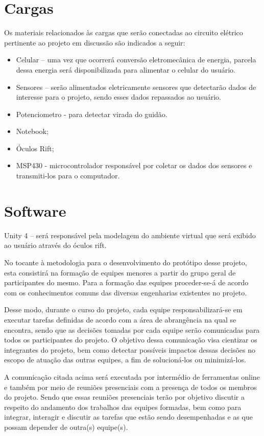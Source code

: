 \section{Cargas}
Os materiais relacionados às cargas que serão conectadas ao circuito elétrico pertinente ao projeto em discussão são indicados a seguir:
\begin{itemize}
\item Celular – uma vez que ocorrerá conversão eletromecânica de energia, parcela dessa energia será disponibilizada para alimentar o celular do usuário.
\item Sensores – serão alimentados eletricamente sensores que detectarão dados de interesse para o projeto, sendo esses dados repassados ao usuário.
\item Potenciometro - para detectar virada do guidão.
\item Notebook;
\item Óculos Rift;
\item MSP430 - microcontrolador responsável por coletar os dados dos sensores e transmiti-los para o computador.
\end{itemize}

\section{Software}

Unity 4 – será responsável pela modelagem do ambiente virtual que será exibido ao usuário através do óculos rift.

No tocante à metodologia para o desenvolvimento do protótipo desse projeto, esta consistirá na formação de equipes menores a partir do grupo geral de participantes do mesmo.  Para a formação das equipes proceder-se-á de acordo com os conhecimentos comuns das diversas engenharias existentes no projeto. 

Desse modo, durante o curso do projeto, cada equipe responsabilizará-se em executar tarefas definidas de acordo com a área de abrangência na qual se encontra, sendo que as decisões tomadas por cada equipe serão comunicadas para todos os participantes do projeto. O objetivo dessa comunicação visa cientizar os integrantes do projeto, bem como detectar possíveis impactos dessas decisões no escopo de atuação das outras equipes, a fim de solucioná-los ou minimizá-los.

A comunicação citada acima será executada por intermédio de ferramentas online e também por meio de reuniões presenciais com a presença de todos os membros do projeto. Sendo que essas reuniões presenciais terão por objetivo discutir a respeito do andamento dos trabalhos das equipes formadas, bem como para integrar, interagir e discutir as tarefas que estão sendo desempenhadas e as que possam depender de outra(s) equipe(s). 

